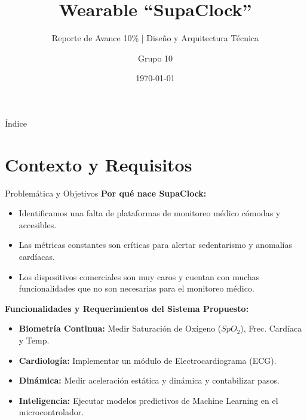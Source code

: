 \documentclass[aspectratio=169, 10pt]{beamer}
\title{Wearable ``SupaClock''}
\subtitle{Reporte de Avance 10\% | Diseño y Arquitectura Técnica}
\date{\today}
\author{Grupo 10}
\institute{Ingeniería Eléctrica}
\begin{document}
\maketitle

\begin{frame}{Índice}
    \tableofcontents
\end{frame}

\section{Contexto y Requisitos}

\begin{frame}{Problemática y Objetivos}
    \textbf{Por qué nace SupaClock:}
    \begin{itemize}
        \item Identificamos una falta de plataformas de monitoreo médico cómodas y accesibles.
        \item Las métricas constantes son críticas para alertar sedentarismo y anomalías cardíacas.
        \item Los dispositivos comerciales son muy caros y cuentan con muchas funcionalidades que no son necesarias para el monitoreo médico.
    \end{itemize}
    \vspace{0.3cm}
    \textbf{Funcionalidades y Requerimientos del Sistema Propuesto:}
    \begin{itemize}
        \item \textbf{Biometría Continua:} Medir Saturación de Oxígeno ($SpO_2$), Frec. Cardíaca y Temp.
        \item \textbf{Cardiología:} Implementar un módulo de Electrocardiograma (ECG).
        \item \textbf{Dinámica:} Medir aceleración estática y dinámica y contabilizar pasos.
        \item \textbf{Inteligencia:} Ejecutar modelos predictivos de Machine Learning en el microcontrolador.
    \end{itemize}
\end{frame}
\end{document}
